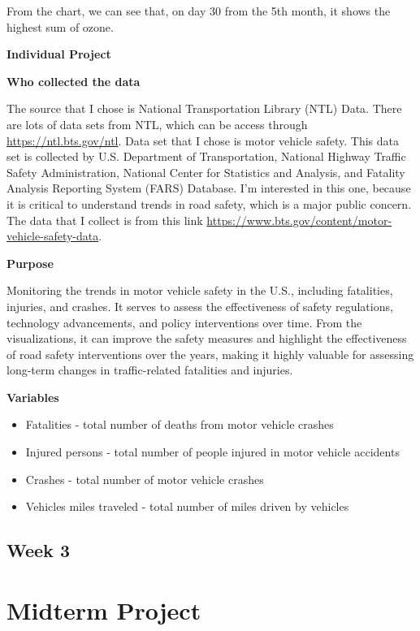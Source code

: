 \documentclass[
  letterpaper,
  DIV=11,
  numbers=noendperiod]{scrreprt}
\begin{document}
From the chart, we can see that, on day 30 from the 5th month, it shows
the highest sum of ozone.

\textbf{Individual Project}

\textbf{Who collected the data}

The source that I chose is National Transportation Library (NTL) Data.
There are lots of data sets from NTL, which can be access through
\url{https://ntl.bts.gov/ntl}. Data set that I chose is motor vehicle
safety. This data set is collected by U.S. Department of Transportation,
National Highway Traffic Safety Administration, National Center for
Statistics and Analysis, and Fatality Analysis Reporting System (FARS)
Database. I'm interested in this one, because it is critical to
understand trends in road safety, which is a major public concern. The
data that I collect is from this link
\url{https://www.bts.gov/content/motor-vehicle-safety-data}.

\textbf{Purpose}

Monitoring the trends in motor vehicle safety in the U.S., including
fatalities, injuries, and crashes. It serves to assess the effectiveness
of safety regulations, technology advancements, and policy interventions
over time. From the visualizations, it can improve the safety measures
and highlight the effectiveness of road safety interventions over the
years, making it highly valuable for assessing long-term changes in
traffic-related fatalities and injuries.

\textbf{Variables}

\begin{itemize}
\item
  Fatalities - total number of deaths from motor vehicle crashes
\item
  Injured persons - total number of people injured in motor vehicle
  accidents
\item
  Crashes - total number of motor vehicle crashes
\item
  Vehicles miles traveled - total number of miles driven by vehicles
\end{itemize}

\subsection{Week 3}\label{week-3-1}

\section{Midterm Project}\label{midterm-project}
\end{document}
